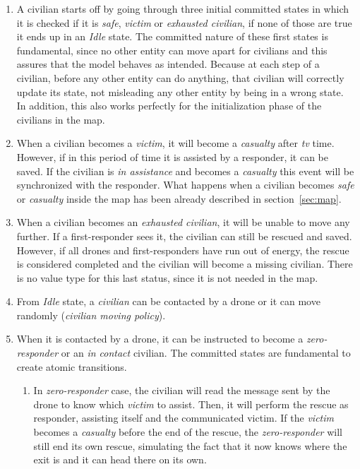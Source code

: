 \begin{enumerate}
	\item A civilian starts off by going through three initial committed states in which it is checked if it is \textit{safe}, \textit{victim} or \textit{exhausted civilian}, if none of those are true it ends up in an \textit{Idle} state. The committed nature of these first states is fundamental, since no other entity can move apart for civilians and this assures that the model behaves as intended. Because at each step of a civilian, before any other entity can do anything, that civilian will correctly update its state, not misleading any other entity by being in a wrong state. In addition, this also works perfectly for the initialization phase of the civilians in the map.
	
	\item When a civilian becomes a \textit{victim}, it will become a \textit{casualty} after \textit{tv} time. However, if in this period of time it is assisted by a responder, it can be saved. If the civilian is \textit{in assistance} and becomes a \textit{casualty} this event will be synchronized with the responder. What happens when a civilian becomes \textit{safe} or \textit{casualty} inside the map has been already described in section~\ref{sec:map}.
	
	\item When a civilian becomes an \textit{exhausted civilian}, it will be unable to move any further. If a first-responder sees it, the civilian can still be rescued and saved. However, if all drones and first-responders have run out of energy, the rescue is considered completed and the civilian will become a missing civilian. There is no value type for this last status, since it is not needed in the map.
	
	\item From \textit{Idle} state, a \textit{civilian} can be contacted by a drone or it can move randomly (\textit{civilian moving policy}).
	
	\item When it is contacted by a drone, it can be instructed to become a \textit{zero-responder} or an \textit{in contact} civilian. The committed states are fundamental to create atomic transitions.
	
	\begin{enumerate}
		\item In \textit{zero-responder} case, the civilian will read the message sent by the drone to know which \textit{victim} to assist. Then, it will perform the rescue as responder, assisting itself and the communicated victim. If the \textit{victim} becomes a \textit{casualty} before the end of the rescue, the \textit{zero-responder} will still end its own rescue, simulating the fact that it now knows where the exit is and it can head there on its own.
		

\end{enumerate}
\end{enumerate}

